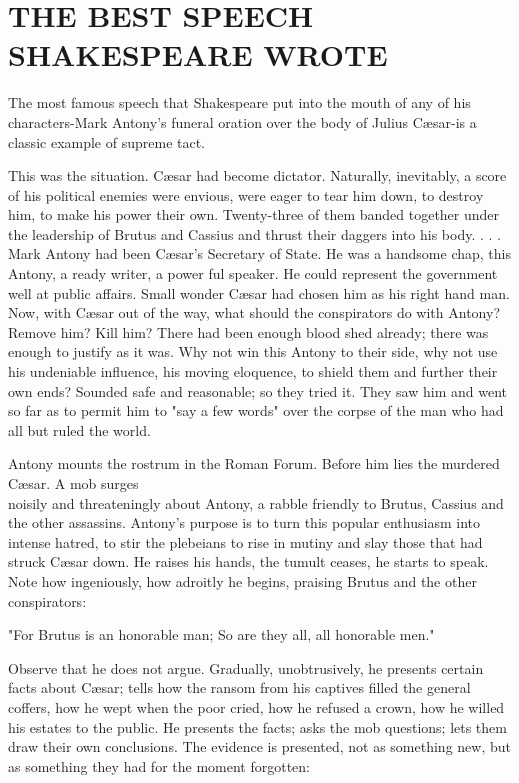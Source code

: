 \documentclass[10pt]{article}
\begin{document}
\section*{THE BEST SPEECH SHAKESPEARE WROTE}
The most famous speech that Shakespeare put into the mouth of any of his characters-Mark Antony's funeral oration over the body of Julius Cæsar-is a classic example of supreme tact.

This was the situation. Cæsar had become dictator. Naturally, inevitably, a score of his political enemies were envious, were eager to tear him down, to destroy him, to make his power their own. Twenty-three of them banded together under the leadership of Brutus and Cassius and thrust their daggers into his body. . . . Mark Antony had been Cæsar's Secretary of State. He was a handsome chap, this Antony, a ready writer, a power ful speaker. He could represent the government well at public affairs. Small wonder Cæsar had chosen him as his right hand man. Now, with Cæsar out of the way, what should the conspirators do with Antony? Remove him? Kill him? There had been enough blood shed already; there was enough to justify as it was. Why not win this Antony to their side, why not use his undeniable influence, his moving eloquence, to shield them and further their own ends? Sounded safe and reasonable; so they tried it. They saw him and went so far as to permit him to "say a few words" over the corpse of the man who had all but ruled the world.

Antony mounts the rostrum in the Roman Forum. Before him lies the murdered Cæsar. A mob surges\\
noisily and threateningly about Antony, a rabble friendly to Brutus, Cassius and the other assassins. Antony's purpose is to turn this popular enthusiasm into intense hatred, to stir the plebeians to rise in mutiny and slay those that had struck Cæsar down. He raises his hands, the tumult ceases, he starts to speak. Note how ingeniously, how adroitly he begins, praising Brutus and the other conspirators:

\begin{displayquote}
"For Brutus is an honorable man; So are they all, all honorable men."
\end{displayquote}

Observe that he does not argue. Gradually, unobtrusively, he presents certain facts about Cæsar; tells how the ransom from his captives filled the general coffers, how he wept when the poor cried, how he refused a crown, how he willed his estates to the public. He presents the facts; asks the mob questions; lets them draw their own conclusions. The evidence is presented, not as something new, but as something they had for the moment forgotten:
\end{document}
